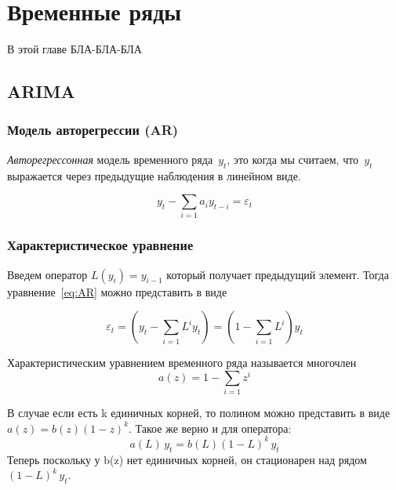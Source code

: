 \documentclass[../handbook.tex]{subfiles}
\begin{document}
\chapter{Временные ряды}

В этой главе БЛА-БЛА-БЛА

\section{ARIMA}

\subsection{Модель авторегрессии (AR)}
\emph{Авторегрессонная} модель временного ряда~$y_t$, это когда мы считаем, что~$y_t$ выражается через предыдущие наблюдения в линейном виде.

\begin{equation}
    \label{eq:AR}
    y_t - \sum_{i=1} a_i y_{t-i} = \varepsilon_t
\end{equation}

\subsection{Характеристическое уравнение}
Введем оператор $L(y_i) = y_{i-1}$ который получает предыдущий элемент. Тогда уравнение~\eqref{eq:AR} можно представить в виде

\begin{equation}
    \varepsilon_t = \left(y_t - \sum_{i=1}L^i y_t\right) =  (1 - \sum_{i=1}L^i) y_t
\end{equation}

Характеристическим уравнением временного ряда называется многочлен
\begin{equation}
    \label{eq:ts:character}
    a(z) = 1 - \sum_{i=1}z^i
\end{equation}

В случае если есть k единичных корней, то полином можно представить в виде $a(z) = b(z) (1-z)^k$. Такое же верно и для оператора:
\begin{equation}
    a(L)\, y_t = b(L) (1 - L)^k \, y_t
\end{equation}
Теперь поскольку у b(z) нет единичных корней, он стационарен над рядом $(1-L)^k \, y_t$.
\end{document}
